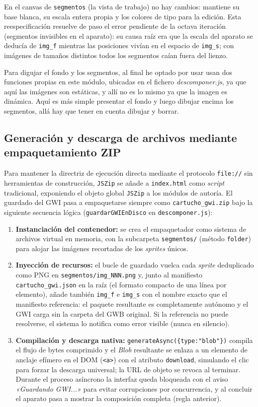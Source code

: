 En el canvas de \texttt{segmentos} (la vista de trabajo) no hay cambios: mantiene su base blanca, su escala entera propia y los colores de tipo para la edición. Esta reespecificación resuelve de paso el error pendiente de la octava iteración (segmentos invisibles en el aparato): su causa raíz era que la escala del aparato se deducía de \texttt{img\_f} mientras las posiciones vivían en el espacio de \texttt{img\_s}; con imágenes de tamaños distintos todos los segmentos caían fuera del lienzo.

Para digujar el fondo y los segmentos, al final he optado por usar usan dos funciones propias en este módulo, ubicadas en el fichero \textit{descomponer.js}, ya que aquí las imágenes son estáticas, y allí no es lo mismo ya que la imagen es dinámica. Aquí es más simple presentar el fondo y luego dibujar encima los segmentos, allá hay que tener en cuenta dibujar y borrar.

\subsection{Generación y descarga de archivos mediante empaquetamiento ZIP}
\label{subsec:generarZIP}

Para mantener la directriz de ejecución directa mediante el protocolo \texttt{file://} sin herramientas de construcción, \texttt{JSZip} se añade a \texttt{index.html} como \textit{script} tradicional, exponiendo el objeto global \texttt{JSZip} a los módulos de autoría. El guardado del GWI pasa a empaquetarse siempre como \texttt{cartucho\_gwi.zip} bajo la siguiente secuencia lógica (\texttt{guardarGWIEnDisco} en \texttt{descomponer.js}):

\begin{enumerate}
	\item \textbf{Instanciación del contenedor:} se crea el empaquetador como sistema de archivos virtual en memoria, con la subcarpeta \texttt{segmentos/} (método \texttt{folder}) para alojar las imágenes recortadas de los \textit{sprites} únicos.
	\item \textbf{Inyección de recursos:} el bucle de guardado vuelca cada \textit{sprite} deduplicado como PNG en \texttt{segmentos/img\_NNN.png} y, junto al manifiesto \texttt{cartucho\_gwi.json} en la raíz (el formato compacto de una línea por elemento), añade también \texttt{img\_f} e \texttt{img\_s} con el nombre exacto que el manifiesto referencia: el paquete resultante es completamente autónomo y el GWI carga sin la carpeta del GWB original. Si la referencia no puede resolverse, el sistema lo notifica como error visible (nunca en silencio).
	\item \textbf{Compilación y descarga nativa:} \texttt{generateAsync(\{type:"blob"\})} compila el flujo de bytes comprimido y el \textit{Blob} resultante se enlaza a un elemento de anclaje efímero en el DOM (\texttt{<a>}) con el atributo \texttt{download}, simulando el clic para forzar la descarga universal; la URL de objeto se revoca al terminar. Durante el proceso asíncrono la interfaz queda bloqueada con el aviso \textit{«Guardando GWI...»} para evitar corrupciones por concurrencia, y al concluir el aparato pasa a mostrar la composición completa (regla anterior).
\end{enumerate}


